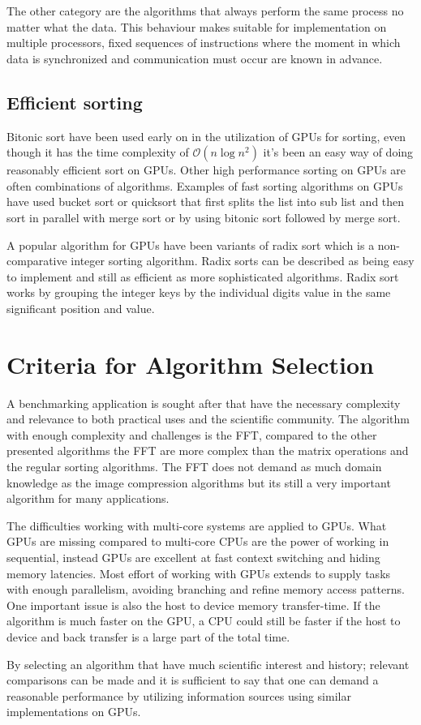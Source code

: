 The other category are the algorithms that always perform the same process no matter what the data. This behaviour makes suitable for implementation on multiple processors, fixed sequences of instructions where the moment in which data is synchronized and communication must occur are known in advance.

\subsection{Efficient sorting}
Bitonic sort have been used early on in the utilization of \gls{GPU}s for sorting, even though it has the time complexity of $\mathcal{O}(n\log{n^2})$ it's been an easy way of doing reasonably efficient sort on \gls{GPU}s. Other high performance sorting on \gls{GPU}s are often combinations of algorithms. Examples of fast sorting algorithms on GPUs have used bucket sort or quicksort that first splits the list into sub list and then sort in parallel with merge sort or by using bitonic sort followed by merge sort.

A popular algorithm for GPUs have been variants of radix sort which is a non-comparative integer sorting algorithm. Radix sorts can be described as being easy to implement and still as efficient as more sophisticated algorithms. Radix sort works by grouping the integer keys by the individual digits value in the same significant position and value.

\section{Criteria for Algorithm Selection}
A benchmarking application is sought after that have the necessary complexity and relevance to both practical uses and the scientific community. The algorithm with enough complexity and challenges is the \gls{FFT}, compared to the other presented algorithms the \gls{FFT} are more complex than the matrix operations and the regular sorting algorithms. The \gls{FFT} does not demand as much domain knowledge as the image compression algorithms but its still a very important algorithm for many applications.

The difficulties working with multi-core systems are applied to \gls{GPU}s. What \gls{GPU}s are missing compared to multi-core \gls{CPU}s are the power of working in sequential, instead \gls{GPU}s are excellent at fast context switching and hiding memory latencies. Most effort of working with \gls{GPU}s extends to supply tasks with enough parallelism, avoiding branching and refine memory access patterns. One important issue is also the host to device memory transfer-time. If the algorithm is much faster on the \gls{GPU}, a \gls{CPU} could still be faster if the host to device and back transfer is a large part of the total time.

By selecting an algorithm that have much scientific interest and history; relevant comparisons can be made and it is sufficient to say that one can demand a reasonable performance by utilizing information sources using similar implementations on \gls{GPU}s.